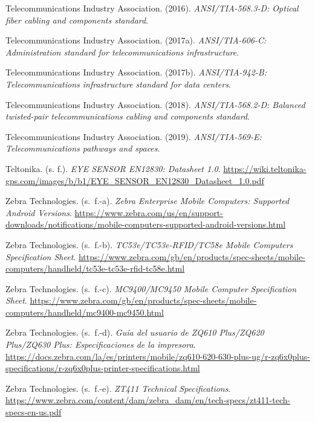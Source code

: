 \begin{list}{}{\setlength{\leftmargin}{1.27cm}\setlength{\itemindent}{-1.27cm}\setlength{\itemsep}{0.5\baselineskip}\raggedright}
\item Telecommunications Industry Association. (2016). \textit{ANSI/TIA-568.3-D: Optical fiber cabling and components standard}.
\item Telecommunications Industry Association. (2017a). \textit{ANSI/TIA-606-C: Administration standard for telecommunications infrastructure}.
\item Telecommunications Industry Association. (2017b). \textit{ANSI/TIA-942-B: Telecommunications infrastructure standard for data centers}.
\item Telecommunications Industry Association. (2018). \textit{ANSI/TIA-568.2-D: Balanced twisted-pair telecommunications cabling and components standard}.
\item Telecommunications Industry Association. (2019). \textit{ANSI/TIA-569-E: Telecommunications pathways and spaces}.
\item Teltonika. (s. f.). \textit{EYE SENSOR EN12830: Datasheet 1.0}. \url{https://wiki.teltonika-gps.com/images/b/b1/EYE_SENSOR_EN12830_Datasheet_1.0.pdf}
\item Zebra Technologies. (s.~f.-a). \textit{Zebra Enterprise Mobile Computers: Supported Android Versions}. \url{https://www.zebra.com/us/en/support-downloads/notifications/mobile-computers-supported-android-versions.html}
\item Zebra Technologies. (s.~f.-b). \textit{TC53e/TC53e-RFID/TC58e Mobile Computers Specification Sheet}. \url{https://www.zebra.com/gb/en/products/spec-sheets/mobile-computers/handheld/tc53e-tc53e-rfid-tc58e.html}
\item Zebra Technologies. (s.~f.-c). \textit{MC9400/MC9450 Mobile Computer Specification Sheet}. \url{https://www.zebra.com/gb/en/products/spec-sheets/mobile-computers/handheld/mc9400-mc9450.html}
\item Zebra Technologies. (s.~f.-d). \textit{Guía del usuario de ZQ610 Plus/ZQ620 Plus/ZQ630 Plus: Especificaciones de la impresora}. \url{https://docs.zebra.com/la/es/printers/mobile/zq610-620-630-plus-ug/r-zq6x0plus-specifications/r-zq6x0plus-printer-specifications.html}
\item Zebra Technologies. (s.~f.-e). \textit{ZT411 Technical Specifications}. \url{https://www.zebra.com/content/dam/zebra_dam/en/tech-specs/zt411-tech-specs-en-us.pdf}
\end{list}

\label{fuente-15-anexo-t11-fin}
